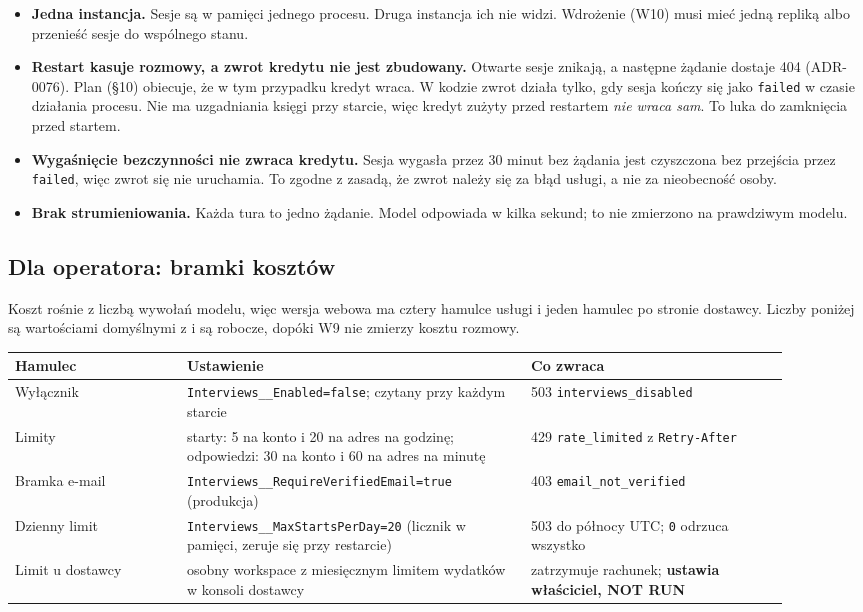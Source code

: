{\begin{itemize}[leftmargin=*,itemsep=2pt]
  \item \textbf{Jedna instancja.} Sesje są w pamięci jednego procesu. Druga
        instancja ich nie widzi. Wdrożenie (W10) musi mieć jedną repliką albo
        przenieść sesje do wspólnego stanu.
  \item \textbf{Restart kasuje rozmowy, a zwrot kredytu nie jest zbudowany.}
        Otwarte sesje znikają, a następne żądanie dostaje 404 (ADR-0076). Plan
        (§10) obiecuje, że w tym przypadku kredyt wraca. W kodzie zwrot działa
        tylko, gdy sesja kończy się jako \texttt{failed} w czasie działania
        procesu. Nie ma uzgadniania księgi przy starcie, więc kredyt zużyty
        przed restartem \emph{nie wraca sam}. To luka do zamknięcia przed
        startem.
  \item \textbf{Wygaśnięcie bezczynności nie zwraca kredytu.} Sesja wygasła
        przez 30 minut bez żądania jest czyszczona bez przejścia przez
        \texttt{failed}, więc zwrot się nie uruchamia. To zgodne z zasadą, że
        zwrot należy się za błąd usługi, a nie za nieobecność osoby.
  \item \textbf{Brak strumieniowania.} Każda tura to jedno żądanie. Model odpowiada
        w kilka sekund; to nie zmierzono na prawdziwym modelu.
\end{itemize}

\subsection{Dla operatora: bramki kosztów}

Koszt rośnie z liczbą wywołań modelu, więc wersja webowa ma cztery hamulce
usługi i jeden hamulec po stronie dostawcy. Liczby poniżej są wartościami
domyślnymi z  i są robocze, dopóki W9 nie zmierzy
kosztu rozmowy.

\begin{longtable}{@{}p{0.2\linewidth}p{0.4\linewidth}p{0.3\linewidth}@{}}
\toprule
Hamulec & Ustawienie & Co zwraca \\
\midrule
\endhead
Wyłącznik & \texttt{Interviews\_\allowbreak{}\_\allowbreak{}Enabled=false}; czytany przy każdym starcie &
503 \texttt{interviews\_\allowbreak{}disabled} \\
Limity & starty: 5 na konto i 20 na adres na godzinę; odpowiedzi: 30 na konto i
60 na adres na minutę & 429 \texttt{rate\_\allowbreak{}limited} z \texttt{Retry-After} \\
Bramka e-mail & \texttt{Interviews\_\allowbreak{}\_\allowbreak{}RequireVerifiedEmail=true} (produkcja) &
403 \texttt{email\_\allowbreak{}not\_\allowbreak{}verified} \\
Dzienny limit & \texttt{Interviews\_\allowbreak{}\_\allowbreak{}MaxStartsPerDay=20} (licznik w pamięci,
zeruje się przy restarcie) & 503 do północy UTC; \texttt{0} odrzuca wszystko \\
Limit u dostawcy & osobny workspace z miesięcznym limitem wydatków w konsoli
dostawcy & zatrzymuje rachunek; \textbf{ustawia właściciel, NOT RUN} \\
\bottomrule
\end{longtable}

}
